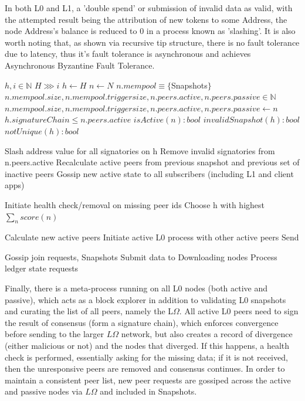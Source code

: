 \documentclass{article}
\begin{document}
In both L0 and L1, a 'double spend' or submission of invalid data as valid, with the attempted result being the attribution of new tokens to some Address, the node Address's balance is reduced to 0 in a process known as 'slashing'. It is also worth noting that, as shown via recursive tip structure, there is no fault tolerance due to latency, thus it's fault tolerance is asynchronous and achieves Asynchronous Byzantine Fault Tolerance.

\begin{algorithm}
\caption{$L \Omega$}\label{alg:cap}
\begin{algorithmic}
\State $h, i \in \mathbb{N}$
\State $H \ggg  i$
\State $h \gets H$
\State $n \gets N$ 
\State $n.mempool \equiv \{ $Snapshots$ \}$
\State $n.mempool.size, n.mempool.triggersize, n.peers.active, n.peers.passive \in \mathbb{N}$
\State $n.mempool.size, n.mempool.triggersize, n.peers.active, n.peers.passive \gets n$ 
\State $h.signatureChain \leq n.peers.active$ 
\State $isActive(n): bool$
\State $invalidSnapshot(h): bool$
\State $notUnique(h): bool$

		\State Slash address value for all signatories on h
		\State Remove invalid signatories from n.peers.active
			\State Recalculate active peers from previous snapshot and previous set of inactive peers
			\State Gossip new active state to all subscribers (including L1 and client apps)
		\EndIf
		
			\State Initiate health check/removal on missing peer ids
		\EndIf
		\State Choose h with highest $\sum_n{score(n)}$

    			\State Calculate new active peers
				\State Initiate active L0 process with other active peers
			\EndIf
    		\State Send 
		
	    		\State Gossip join requests, Snapshots
			\State Submit data to Downloading nodes
			\State Process ledger state requests
		
	\EndIf
\EndFor
\end{algorithmic}
\end{algorithm}

Finally, there is a meta-process running on all L0 nodes (both active and passive), which acts as a block explorer in addition to validating L0 snapshots and curating the list of all peers, namely the L$\Omega$. All active L0 peers need to sign the result of consensus (form a signature chain), which enforces convergence before sending to the larger $L\Omega$ network, but also creates a record of divergence (either malicious or not) and the nodes that diverged. If this happens, a health check is performed, essentially asking for the missing data; if it is not received, then the unresponsive peers are removed and consensus continues. In order to maintain a consistent peer list, new peer requests are gossiped across the active and passive nodes via $L\Omega$ and included in Snapshots.
\end{document}
